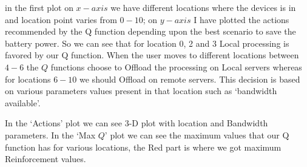 \documentclass{article}
\begin{document}
in the first plot on $x-axis$ we have different locations where the devices is in and location point varies from $0-10$; on $y-axis$ I have plotted the actions recommended by the Q function depending upon the best scenario to save the battery power. So we can see that for location 0, 2 and 3 Local processing is favored by our Q function. When the user moves to different locations between $4-6$ the $Q$ functions choose to Offload the processing on Local servers whereas for locations $6-10$ we should Offload on remote servers. This decision is based on various parameters values present in that location such as `bandwidth available'. \par
In the `Actions' plot we can see 3-D plot with location and Bandwidth parameters. In the `Max $Q$' plot we can see the maximum values that our Q function has for various locations, the Red part is where we got maximum Reinforcement values. 
\end{document}
